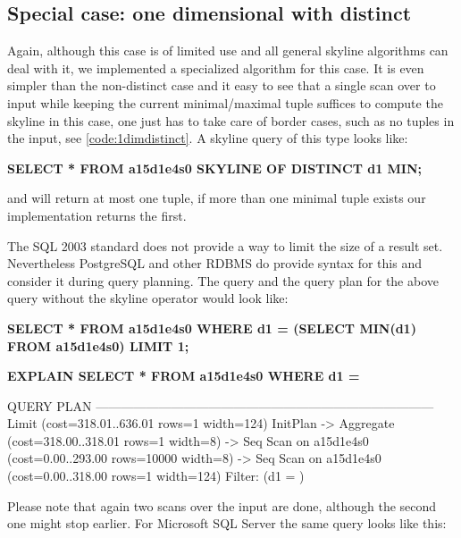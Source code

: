 \subsection{Special case: one dimensional with distinct}
\label{sec:onedim-distinct}
Again, although this case is of limited use and all general skyline algorithms
can deal with it, we implemented a specialized algorithm for this
case.  It is even simpler than the non-distinct case and it easy to
see that a single scan over to input while keeping the current
minimal/maximal tuple suffices to compute the skyline in this case,
one just has to take care of border cases, such as no tuples in the
input, see \autoref{code:1dimdistinct}. A skyline query of this type looks
like:

\begin{interactive}
\textbf{SELECT * FROM a15d1e4s0 SKYLINE OF DISTINCT d1 MIN;}
\end{interactive}

\noindent
and will return at most one tuple, if more than one minimal tuple
exists our implementation returns the first.

The SQL 2003 standard \citep{SQL2003} does not provide a way
to limit the size of a result set. Nevertheless PostgreSQL and other
RDBMS do provide syntax for this and consider it during query
planning. The query and the query plan for the above query without
the skyline operator would look like:

\begin{interactive}
\textbf{SELECT * FROM a15d1e4s0 WHERE d1 = (SELECT MIN(d1) FROM a15d1e4s0) LIMIT 1;}

\textbf{EXPLAIN SELECT * FROM a15d1e4s0 WHERE d1 = }\ellipsis

                                    QUERY PLAN                                   
---------------------------------------------------------------------------------
 Limit  (cost=318.01..636.01 rows=1 width=124)
   InitPlan
     ->  Aggregate  (cost=318.00..318.01 rows=1 width=8)
           ->  Seq Scan on a15d1e4s0  (cost=0.00..293.00 rows=10000 width=8)
   ->  Seq Scan on a15d1e4s0  (cost=0.00..318.00 rows=1 width=124)
         Filter: (d1 = )
\end{interactive}

\noindent
Please note that again two scans over the input are done, although the
second one might stop earlier. For Microsoft SQL Server the same query
looks like this:

